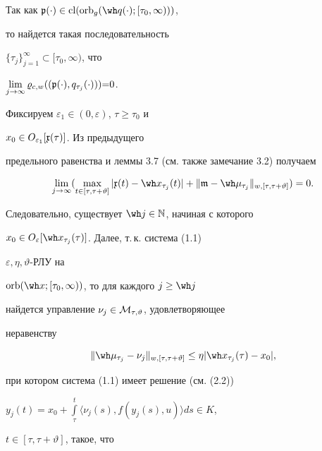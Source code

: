 \begin{pf}


Так как $\frak p(\cdot)\in\cl(\orb_g(\wh q(\cdot);[\tau_0,\infty)))$,


то найдется такая последовательность


$\{\tau_j\}_{j=1}^{\infty}\subset[\tau_0,\infty)$, что


$\lim\limits_{j\to\infty}\varrho_{c,w}((\frak p(\cdot),


q_{\tau_j}(\cdot))){=}0$.


Фиксируем $\varepsilon_1\in(0,\varepsilon)$, $\tau\ge\tau_0$ и


$x_0\in O_{\varepsilon_1}[\frak x(\tau)]$. Из предыдущего


предельного равенства и леммы 3.7 (см. также замечание 3.2) получаем


\begin{equation}


\lim_{j\to\infty}(\max_{t\in[\tau,\tau+\vartheta]}


|\frak x(t)-\wh x_{\tau_j}(t)|+


\|\frak m-\wh\mu_{\tau_j}\|_{w,[\tau,\tau+\vartheta]})=0.


\end{equation}


Следовательно, существует $\wh j\in\Bbb N$, начиная с которого


$x_0\in O_{\varepsilon}[\wh x_{\tau_j}(\tau)]$. Далее, т.\,к. система (1.1)


$\varepsilon,\eta,\vartheta$-РЛУ на


$\orb(\wh x;[\tau_0,\infty))$, то для каждого $j\ge\wh j$


найдется управление $\nu_j\in\cal M_{\tau,\vartheta}$, удовлетворяющее


неравенству


\begin{equation}


\|\wh\mu_{\tau_j}-\nu_j\|_{w,[\tau,\tau+\vartheta]}


\le\eta|\wh x_{\tau_j}(\tau)-x_0|,


\end{equation}


при котором система (1.1) имеет решение (см. (2.2))


$y_j(t)=x_0+\int\limits_\tau^t\langle\nu_j(s),f(y_j(s),u)\rangle ds\in K$,


$t\in[\tau,\tau+\vartheta]$, такое, что


\begin{equation}



\end{equation}
\end{pf}
